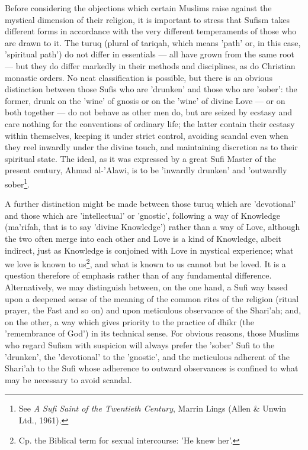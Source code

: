 \documentclass[11pt, b5paper, twoside]{book}
\begin{document}
Before considering the objections which certain Muslims raise against the mystical dimension of their 
religion, it is important to stress that Sufism takes different forms in accordance with the very 
different temperaments of those who are drawn to it. The turuq (plural of tariqah, which means 'path' 
or, in this case, 'spiritual path') do not differ in essentials --- all have grown from the same root --- 
but they do differ markedly in their methods and disciplines, as do Christian monastic orders. No 
neat classification is possible, but there is an obvious distinction between those Sufis who are 
'drunken' and those who are 'sober': the former, drunk on the 'wine' of gnosis or on the 'wine' of 
divine Love --- or on both together --- do not behave as other men do, but are seized by ecstasy and care 
nothing for the conventions of ordinary life; the latter contain their ecstasy within themselves, 
keeping it under strict control, avoiding scandal even when they reel inwardly under the divine 
touch, and maintaining discretion as to their spiritual state. The ideal, as it was expressed by a 
great Sufi Master of the present century, Ahmad al-'Alawi, is to be 'inwardly drunken' and 'outwardly 
sober\footnote{See \emph{A Sufi Saint of the Twentieth Century}, Marrin Lings (Allen \& Unwin Ltd., 1961).}.

A further distinction might be made between those turuq which are 'devotional' and those which are 
'intellectual' or 'gnostic', following a way of Knowledge (ma'rifah, that is to say 'divine 
Knowledge') rather than a way of Love, although the two often merge into each other and Love is a 
kind of Knowledge, albeit indirect, just as Knowledge is conjoined with Love in mystical experience; 
what we love is known to us\footnote{Cp. the Biblical term for sexual intercourse: 'He knew her'.}, and what is known to us cannot but be loved. It is a question 
therefore of emphasis rather than of any fundamental difference. \\

Alternatively, we may distinguish between, on the one hand, a Sufi way based upon a deepened sense of 
the meaning of the common rites of the religion (ritual prayer, the Fast and so on) and upon 
meticulous observance of the Shari'ah; and, on the other, a way which gives priority to the practice 
of dhikr (the 'remembrance of God') in its technical sense. For obvious reasons, those Muslims who 
regard Sufism with suspicion will always prefer the 'sober' Sufi to the 'drunken', the 'devotional' 
to the 'gnostic', and the meticulous adherent of the Shari'ah to the Sufi whose adherence to outward 
observances is confined to what may be necessary to avoid scandal. \\
\end{document}
